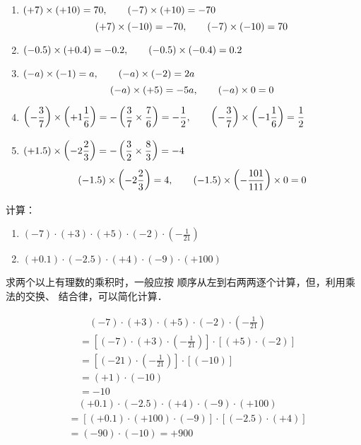 \begin{solution}
\begin{enumerate}
\item $(+7)\times (+10)=70,\qquad (-7)\times (+10)=-70$ 
\[(+7)\times (-10)=-70,\qquad (-7)\times (-10)=70\]
\item $(-0.5)\times (+0.4)=-0.2,\qquad (-0.5)\times (-0.4)=0.2$
\item $(-a)\times (-1)=a,\qquad (-a)\times (-2)=2a$  $$(-a)\times (+5)=-5a,\qquad (-a)\times 0=0$$
\item $\left(-\dfrac{3}{7}\right)\times \left(+1\dfrac{1}{6}\right)=-\left(\dfrac{3}{7}\times\dfrac{7}{6}\right)=-\dfrac{1}{2},\qquad \left(-\dfrac{3}{7}\right)\times \left(-1\dfrac{1}{6}\right)=\dfrac{1}{2} $
\item  $(+1.5)\times \left(-2\dfrac{2}{3}\right)=-\left(\dfrac{3}{2}\times\dfrac{8}{3}\right)=-4$
\[(-1.5)\times \left(-2\dfrac{2}{3}\right)=4,\qquad (-1.5)\times \left(-\dfrac{101}{111}\right)\times 0=0 \]
\end{enumerate}

\end{solution}  

\begin{example}
    计算：
\begin{enumerate}
    \item $(-7) \cdot(+3) \cdot(+5) \cdot(-2) \cdot\left(-\frac{1}{21}\right)$
    \item 
    $(+0.1) \cdot(-2.5) \cdot(+4) \cdot(-9) \cdot(+100)$
\end{enumerate}
\end{example}

\begin{analyze}
    求两个以上有理数的乘积时，一般应按
    顺序从左到右两两逐个计算，但，利用乘法的交换、
    结合律，可以简化计算．
\end{analyze}

\begin{solution}
\begin{align*}
  &\quad   (-7) \cdot(+3) \cdot(+5) \cdot(-2) \cdot\left(-\frac{1}{21}\right)\\
  &=\left[(-7)\cdot (+3)\cdot \left(-\frac{1}{21}\right)\right]\cdot [(+5)\cdot (-2)]\tag{交换、结合律}\\
  &=\left[(-21)\cdot \left(-\frac{1}{21}\right)\right]\cdot [(-10)] \tag{异号相乘法则}\\
  &=(+1)\cdot (-10) \tag{同号相乘法则}\\
  &=-10 \tag{1的特性}
\end{align*} 
\begin{align*}
    &\quad (+0.1) \cdot(-2.5) \cdot(+4) \cdot(-9) \cdot(+100)\\
    &=[(+0.1)\cdot (+100)\cdot(-9)]\cdot[(-2.5)\cdot (+4)]\\
    &=(-90)\cdot (-10)=+900
\end{align*}    
\end{solution}

